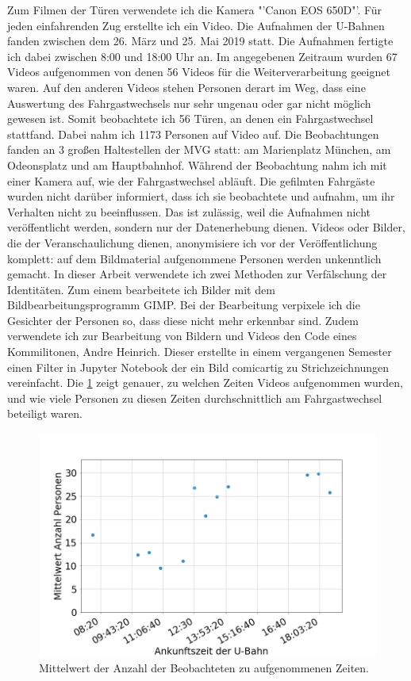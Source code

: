 Zum Filmen der Türen verwendete ich die Kamera "'Canon EOS 650D"'. Für jeden einfahrenden Zug erstellte ich ein Video. Die Aufnahmen der U-Bahnen fanden zwischen dem 26. März und 25. Mai 2019 statt. Die Aufnahmen fertigte ich dabei zwischen 8:00 und 18:00 Uhr an. Im angegebenen Zeitraum wurden 67 Videos aufgenommen von denen 56 Videos für die Weiterverarbeitung geeignet waren. Auf den anderen Videos stehen Personen derart im Weg, dass eine Auswertung des Fahrgastwechsels nur sehr ungenau oder gar nicht möglich gewesen ist. Somit beobachtete ich 56 Türen, an denen ein Fahrgastwechsel stattfand. Dabei nahm ich 1173 Personen auf Video auf. Die Beobachtungen fanden an 3 großen Haltestellen der MVG statt: am Marienplatz München, am Odeonsplatz und am Hauptbahnhof. Während der Beobachtung nahm ich mit einer Kamera auf, wie der Fahrgastwechsel abläuft. Die gefilmten Fahrgäste wurden nicht darüber informiert, dass ich sie beobachtete und aufnahm, um ihr Verhalten nicht zu beeinflussen. Das ist zulässig, weil die Aufnahmen nicht veröffentlicht werden, sondern nur der Datenerhebung dienen. Videos oder Bilder, die der Veranschaulichung dienen, anonymisiere ich vor der Veröffentlichung komplett: auf dem Bildmaterial aufgenommene Personen werden unkenntlich gemacht. In dieser Arbeit verwendete ich zwei Methoden zur Verfälschung der Identitäten. Zum einem bearbeitete ich Bilder mit dem Bildbearbeitungsprogramm \textsf{GIMP}. Bei der Bearbeitung verpixele ich die Gesichter der Personen so, dass diese nicht mehr erkennbar sind. Zudem verwendete ich zur Bearbeitung von Bildern und Videos den Code eines Kommilitonen, Andre Heinrich. Dieser erstellte in einem vergangenen Semester einen Filter in \textsf{Jupyter Notebook} der ein Bild comicartig zu Strichzeichnungen vereinfacht.
Die \figurename \ref{fig:PersonenUberZeit} zeigt genauer, zu welchen Zeiten Videos aufgenommen wurden, und wie viele Personen zu diesen Zeiten durchschnittlich am Fahrgastwechsel beteiligt waren.
\begin{figure}[H]
	\centering
		\includegraphics[width=1.0\textwidth]{pictures/observation/recording/peopleOverTime.png}
	\caption{Mittelwert der Anzahl der Beobachteten zu aufgenommenen Zeiten.}
	\label{fig:PersonenUberZeit}
\end{figure}
